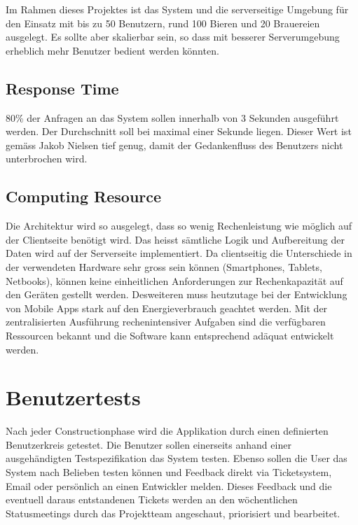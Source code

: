 \documentclass[10pt,a4paper]{scrartcl}
\begin{document}
Im Rahmen dieses Projektes ist das System und die serverseitige Umgebung für den Einsatz mit  bis zu 50 Benutzern, rund 100 Bieren und 20 Brauereien ausgelegt. Es sollte aber skalierbar sein, so dass mit besserer Serverumgebung erheblich mehr Benutzer bedient werden könnten.

	\subsection{Response Time}

	80\% der Anfragen an das System sollen innerhalb von 3 Sekunden ausgeführt werden.
	Der Durchschnitt soll bei maximal einer Sekunde liegen. Dieser Wert ist gemäss Jakob Nielsen tief genug, damit der Gedankenfluss des Benutzers nicht unterbrochen wird\cite{nielsen1993usability}.

	\subsection{Computing Resource}

	Die Architektur wird so ausgelegt, dass so wenig Rechenleistung wie möglich auf der Clientseite benötigt wird. Das heisst sämtliche Logik und Aufbereitung der Daten wird auf der Serverseite implementiert. Da clientseitig die Unterschiede in der verwendeten Hardware sehr gross sein können (Smartphones, Tablets, Netbooks), können keine einheitlichen Anforderungen zur Rechenkapazität auf den Geräten gestellt werden. Desweiteren muss heutzutage bei der Entwicklung von Mobile Apps stark auf den Energieverbrauch geachtet werden. Mit der zentralisierten Ausführung rechenintensiver Aufgaben sind die verfügbaren Ressourcen bekannt und die Software kann entsprechend adäquat entwickelt werden.


\section{Benutzertests}
\label{sec:benutzertests}

Nach jeder Constructionphase wird die Applikation durch einen definierten Benutzerkreis getestet. Die Benutzer sollen einerseits anhand einer ausgehändigten Testspezifikation das System testen. Ebenso sollen die User das System nach Belieben testen können und Feedback direkt via Ticketsystem, Email oder persönlich an einen Entwickler melden. Dieses Feedback und die eventuell daraus entstandenen Tickets werden an den wöchentlichen Statusmeetings durch das Projektteam angeschaut, priorisiert und bearbeitet.
\end{document}
